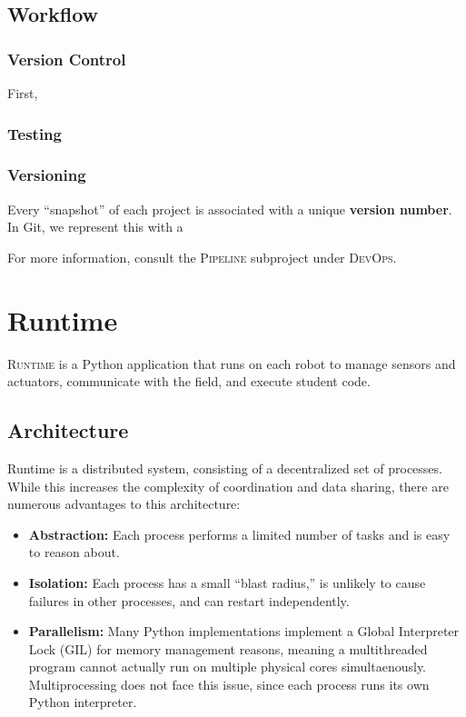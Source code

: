\documentclass[12pt]{book}
\begin{document}
  \section{Workflow}

  \subsection{Version Control}

  First,

  \subsection{Testing}

  \subsection{Versioning}

  Every ``snapshot'' of each project is associated with a unique \textbf{version number}.
  In Git, we represent this with a

  For more information, consult the \textsc{Pipeline} subproject under \textsc{DevOps}.

  \chapter{Runtime}

  \textsc{Runtime} is a Python application that runs on each robot to manage sensors and actuators, communicate with the field, and execute student code.

  \section{Architecture}

  Runtime is a distributed system, consisting of a decentralized set of processes.
  While this increases the complexity of coordination and data sharing, there are numerous advantages to this architecture:
  \begin{itemize}
  \item
    \textbf{Abstraction:} Each process performs a limited number of tasks and is easy to reason about.
  \item
    \textbf{Isolation:} Each process has a small ``blast radius,'' is unlikely to cause failures in other processes, and can restart independently.
  \item
    \textbf{Parallelism:} Many Python implementations implement a Global Interpreter Lock (GIL) for memory management reasons, meaning a multithreaded program cannot actually run on multiple physical cores simultaenously.
    Multiprocessing does not face this issue, since each process runs its own Python interpreter.
  \end{itemize}
\end{document}
